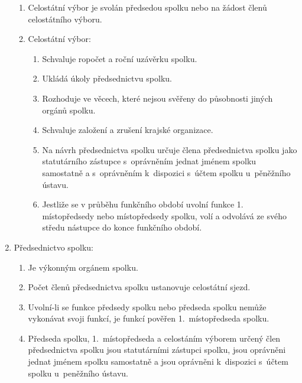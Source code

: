 \documentclass[a4paper]{article}
\begin{document}
\begin{enumerate}
\begin{enumerate}
        \item Celostátní výbor je svolán předsedou spolku
            nebo na žádost  členů
            celostátního výboru.

        \item Celostátní výbor:
            \begin{enumerate}
            \item Schvaluje ropočet a roční uzávěrku spolku.

            \item Ukládá úkoly předsednictvu spolku.

            \item Rozhoduje ve věcech, které nejsou svěřeny
                do působnosti jiných orgánů spolku.

            \item Schvaluje založení a zrušení krajské organizace.

            \item Na návrh předsednictva spolku určuje člena
                předsednictva spolku jako statutárního zástupce 
                s~oprávněním jednat jménem spolku samostatně a
                s~oprávněním k~dispozici s~účtem spolku
                u~pěněžního ústavu.

            \item Jestliže se v průběhu funkčního období uvolní
                funkce 1. místopředsedy nebo místopředsedy spolku,
                volí a odvolává ze svého středu nástupce do konce
                funkčního období.

            \end{enumerate}

        \end{enumerate}

    \item Předsednictvo spolku:
        \begin{enumerate}
        \item Je výkonným orgánem spolku.

        \item Počet členů předsednictva spolku ustanovuje celostátní sjezd.

        \item Uvolní-li se funkce předsedy spolku nebo předseda
            spolku nemůže vykonávat svoji funkcí, je funkcí pověřen
            1.~místopředseda spolku.

        \item Předseda spolku, 1.~místopředseda a celostáním
            výborem určený člen předsednictva spolku jsou
            statutárními zástupci spolku, jsou oprávněni jednat
            jménem spolku samostatně a jsou oprávněni k~dispozici
            s~účtem spolku u~peněžního ústavu.


\end{enumerate}
\end{enumerate}
\end{document}
